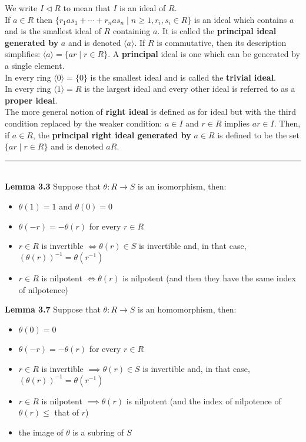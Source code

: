 \documentclass[a4paper]{article}
\begin{document}
\begin{framed}
	\noindent
	We write $I \triangleleft R$ to mean that $I$ is an ideal of $R$.\\
	
	\noindent
	If $a \in R$ then $\{r_1as_1 + \cdots + r_nas_n \; \vert \; n \geq 1, r_i, s_i \in R\}$ is an ideal which contains $a$ and is the smallest ideal of $R$ containing $a$. It is called the \textbf{principal ideal generated by} $a$ and is denoted $\langle a \rangle$. If $R$ is commutative, then its description simplifies: $\langle a \rangle = \{ar \; \vert \; r \in R\}$. A \textbf{principal} ideal is one which can be generated by a single element.\\
	
	\noindent
	In every ring $\langle 0 \rangle = \{ 0 \}$ is the smallest ideal and is called the \textbf{trivial ideal}.\\
	In every ring $\langle 1 \rangle = R$ is the largest ideal and every other ideal is referred to as a \textbf{proper ideal}.\\
	
	\noindent
	The more general notion of \textbf{right ideal} is defined as for ideal but with the third condition replaced by the weaker condition: $a \in I$ and $r \in R$ implies $ar \in I$. Then, if $a \in R$, the \textbf{principal right ideal generated by} $a \in R$ is defined to be the set $\{ar \; \vert \; r \in R\}$ and is denoted $aR$.
	
	\noindent\rule{\textwidth}{0.5pt}\\
	
	\noindent
	\textbf{Lemma 3.3} Suppose that $\theta: R \rightarrow S$ is an isomorphism, then:
	\begin{itemize}
		\item $\theta(1) = 1$ and $\theta(0) = 0$
		\item $\theta(-r) = -\theta(r)$ for every $r \in R$
		\item $r \in R$ is invertible $\iff \theta(r) \in S$ is invertible and, in that case, $(\theta(r))^{-1} = \theta(r^{-1})$
		\item $r \in R$ is nilpotent $\iff \theta(r)$ is nilpotent (and then they have the same index of nilpotence)
	\end{itemize}
	
	\noindent
	\textbf{Lemma 3.7} Suppose that $\theta: R \rightarrow S$ is an homomorphism, then:
	\begin{itemize}
		\item $\theta(0) = 0$
		\item $\theta(-r) = -\theta(r)$ for every $r \in R$
		\item $r \in R$ is invertible $\implies \theta(r) \in S$ is invertible and, in that case, $(\theta(r))^{-1} = \theta(r^{-1})$
		\item $r \in R$ is nilpotent $\implies \theta(r)$ is nilpotent (and the index of nilpotence of $\theta(r) \leq$ that of $r$)
		\item the image of $\theta$ is a subring of $S$
	\end{itemize}
	

\end{framed}
\end{document}
